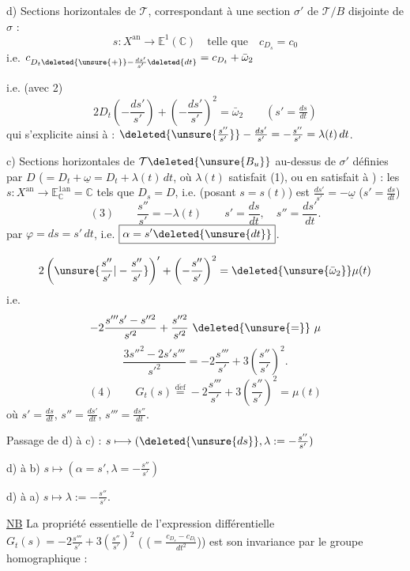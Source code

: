 d) Sections horizontales de $\mathcal T$,  correspondant à une section $\sigma'$ de $\mathcal T/B$ disjointe de $\sigma$ :
\[
s:X^{\mathrm{an}}\longrightarrow\mathbb E^1(\mathbb C)\quad\text{telle que}\quad c_{D_s}=c_0
\]
i.e. $c_{D_t\deleted{\unsure{+}}-\frac{ds'}{s'}\deleted{dt}}=c_{D_t}+\bar\omega_2$

i.e. (avec 2)
\[
2D_t\left(-\frac{ds'}{s'}\right)+\left(-\frac{ds'}{s'}\right)^2=\bar\omega_2\qquad(s'=\tfrac{ds}{dt})
\]
qui s'explicite ainsi à  : $\deleted{\unsure{\frac{s''}{s'}}}-\frac{ds'}{s'}=-\frac{s''}{s'}=\lambda(t)\,dt$.

c) Sections horizontales de $\mathcal T\deleted{\unsure{B_u}}$ au-dessus de $\sigma'$ définies par $D$ ($=D_t+\underline\omega=D_t+\lambda(t)\,dt$, où $\lambda(t)$ satisfait (1), ou en satisfait à ) : les $s:X^{\mathrm{an}}\longrightarrow\mathbb E^{1\mathrm{an}}_{\mathbb C}=\mathbb C$ tels que $D_s=D$, i.e. (posant $s=s(t)$) est $\frac{ds'}{s'}=-\underline\omega$ ($s'=\frac{ds}{dt}$)
\[
(3)\qquad\frac{s''}{s'}=-\lambda(t)\qquad s'=\frac{ds}{dt},\quad s''=\frac{ds'}{dt}.
\]
 par $\varphi=ds=s'\,dt$, i.e. $\boxed{\alpha=s'\deleted{\unsure{dt}}}$.

\[
2\left(\unsure{\frac{s''}{s'}|-\frac{s''}{s'}}\right)'+\left(-\frac{s''}{s'}\right)^2=\deleted{\unsure{\bar\omega_2}}\mu(t)
\]
i.e.
\[
-2\frac{s'''s'-s''^2}{s'^2}+\frac{s''^2}{s'^2}\ \deleted{\unsure{=}}\ \mu
\]
\[
\frac{3s''^2-2s's'''}{s'^2}=-2\frac{s'''}{s'}+3\left(\frac{s''}{s'}\right)^2.
\]
\[
(4)\qquad\boxed{G_t(s)\overset{\mathrm{d\acute ef}}{=}-2\frac{s'''}{s'}+3\left(\frac{s''}{s'}\right)^2=\mu(t)}
\]
où $s'=\frac{ds}{dt}$, $s''=\frac{ds'}{dt}$, $s'''=\frac{ds''}{dt}$.

Passage de d) à c) : $s\longmapsto(\deleted{\unsure{ds}},\lambda:=-\frac{s''}{s'})$

\unsure{---} d) à b) $s\longmapsto(\alpha=s',\lambda=-\frac{s''}{s'})$

\unsure{---} d) à a) $s\longmapsto\lambda:=-\frac{s''}{s'}$.

\uline{NB} La propriété essentielle de l'expression différentielle $G_t(s)=-2\frac{s'''}{s'}+3(\frac{s''}{s'})^2$  ( ($=\frac{c_{D_s}-c_{D_t}}{dt^2}$)) est son invariance par le groupe homographique :

